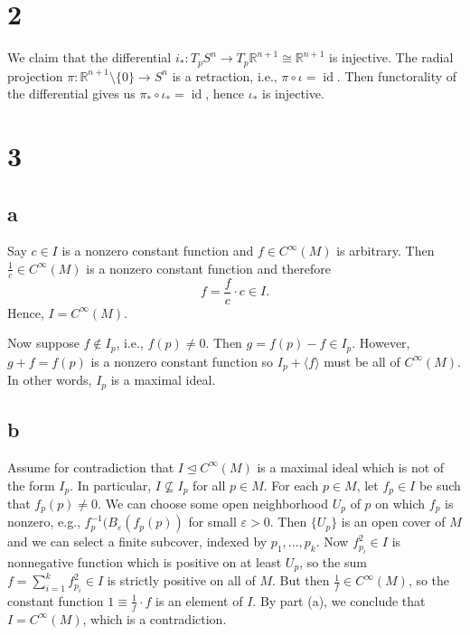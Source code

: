 \documentclass[12pt]{article}
\theoremstyle{definition}
\newcommand{\R}{\mathbb{R}}
\newcommand{\eps}{\varepsilon}
\newcommand{\<}{\langle}
\renewcommand{\>}{\rangle}
\newcommand{\iso}{\cong}
\newcommand{\teq}{\trianglelefteq}
\DeclareMathOperator{\id}{id}
\begin{document}
\newpage

\section*{2}

We claim that the differential $i_* : T_pS^n \to T_p\R^{n+1} \iso \R^{n+1}$ is injective.
The radial projection $\pi : \R^{n+1} \setminus \{0\} \to S^n$ is a retraction, i.e., $\pi \circ \iota = \id$.
Then functorality of the differential gives us $\pi_* \circ \iota_* = \id$, hence $\iota_*$ is injective.


\newpage

\section*{3}

\subsection*{a}

Say $c \in I$ is a nonzero constant function and $f \in C^\infty(M)$ is arbitrary.
Then $\frac{1}{c} \in C^\infty(M)$ is a nonzero constant function and therefore
\[
    f = \frac{f}{c} \cdot c \in I.
\]
Hence, $I = C^\infty(M)$.

Now suppose $f \notin I_p$, i.e., $f(p) \ne 0$.
Then $g = f(p) - f \in I_p$.
However, $g + f = f(p)$ is a nonzero constant function so $I_p + \<f\>$ must be all of $C^\infty(M)$.
In other words, $I_p$ is a maximal ideal.


\subsection*{b}

Assume for contradiction that $I \teq C^\infty(M)$ is a maximal ideal which is not of the form $I_p$.
In particular, $I \nsubseteq I_p$ for all $p \in M$.
For each $p \in M$, let $f_p \in I$ be such that $f_p(p) \ne 0$.
We can choose some open neighborhood $U_p$ of $p$ on which $f_p$ is nonzero, e.g., $f_p^{-1}(B_\eps(f_p(p))$ for small $\eps > 0$.
Then $\{U_p\}$ is an open cover of $M$ and we can select a finite subcover, indexed by $p_1, \dots, p_k$.
Now $f_{p_i}^2 \in I$ is nonnegative function which is positive on at least $U_p$, so the sum $f = \sum_{i=1}^{k} f_{p_i}^2 \in I$ is strictly positive on all of $M$.
But then $\frac{1}{f} \in C^\infty(M)$, so the constant function $1 \equiv \frac{1}{f} \cdot f$ is an element of $I$.
By part (a), we conclude that $I = C^\infty(M)$, which is a contradiction.
\end{document}
